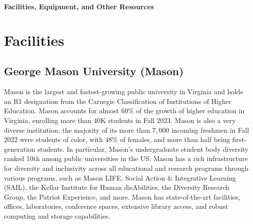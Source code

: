 \documentclass[11pt]{article}
\newcommand{\alert}[1]{{\color{blue}{#1}}}
\begin{document}
\begin{center}
{\Large \textbf{Facilities, Equipment, and Other Resources}}
\end{center}


\section*{Facilities}

\subsection*{George Mason University (Mason)} Mason is the largest and fastest-growing public university in Virginia and holds an R1 designation from the Carnegie Classification of Institutions of Higher Education. Mason accounts for almost $60\%$ of the growth of higher education in Virginia, enrolling more than  $40$K students in Fall 2023. Mason is also a very diverse institution; the majority of its more than $7,000$ incoming freshmen in Fall 2022 were students of color, with $48\%$ of females, and more than half being first-generation students. In particular, Mason's undergraduate student body diversity ranked 10th among public universities in the US. Mason has a rich infrastructure for diversity and inclusivity across all educational and research programs through various programs, such as Mason LIFE, Social Action \& Integrative Learning (SAIL), the Kellar Institute for Human disAbilities, the Diversity Research Group, the Patriot Experience, and more. Mason has state-of-the-art facilities, offices, laboratories,  conference spaces, extensive library access, and robust computing and storage capabilities.

\alert{The PIs and their laboratories reside in Mason's College of Science (PI Agnarsson) and College of Engineering and Computing (PIs Nguyen and Liu). Mason's College of Science has more than $5,000$ undergraduate and graduate students and its College of Enginering and Computing houses close to $9,000$. The two colleges are among the largest at Mason and the primary factor behind Mason being the largest producer of tech talent in Northern Virginia.}


\end{document}
